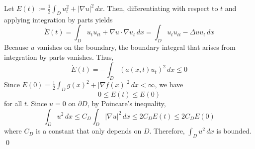 Let $E(t) := \frac{1}{2} \int_D u_t^2 + |\nabla u|^2 \, dx$. Then, differentiating with respect to $t$ and applying integration by parts yields
$$ \dot{E}(t) = \int_D u_t u_{tt} + \nabla u \cdot \nabla u_t \, dx = \int_D u_t u_{tt} - \Delta u u_t \, dx $$
Because $u$ vanishes on the boundary, the boundary integral that arises from integration by parts vanishes. Thus,
$$ \dot{E}(t) = - \int_D (a(x,t)u_t)^2 \, dx \leq 0 $$
Since $E(0) = \frac{1}{2} \int_D g(x)^2 + |\nabla f(x)|^2 \, dx < \infty $, we have
$$ 0 \leq E(t) \leq E(0) $$
for all $t$. Since $u=0$ on $\partial D$, by Poincare's inequality,
$$ \int_D u^2 \, dx \leq C_D \int_D |\nabla u|^2 \, dx \leq 2C_D E(t) \leq 2C_D E(0) $$
where $C_D$ is a constant that only depends on $D$. Therefore, $\int_D u^2 \, dx$ is bounded. \hfill \qed
